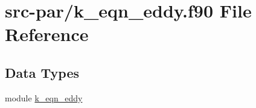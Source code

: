 \hypertarget{k__eqn__eddy_8f90}{\section{src-\/par/k\-\_\-eqn\-\_\-eddy.f90 File Reference}
\label{k__eqn__eddy_8f90}
}
\subsection*{Data Types}
\begin{DoxyCompactItemize}
\item 
module \hyperlink{classk__eqn__eddy}{k\-\_\-eqn\-\_\-eddy}
\end{DoxyCompactItemize}
